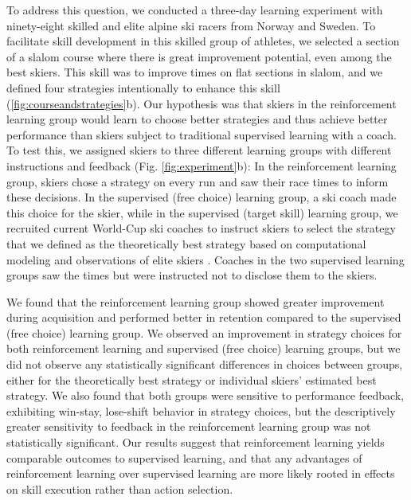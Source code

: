 \documentclass{article}
\begin{document}
To address this question, we conducted a three-day learning experiment with ninety-eight skilled and elite alpine ski racers from Norway and Sweden. To facilitate skill development in this skilled group of athletes, we selected a section of a slalom course where there is great improvement potential, even among the best skiers. This skill was to improve times on flat sections in slalom, and we defined four strategies intentionally to enhance this skill (\ref{fig:courseandstrategies}b). Our hypothesis was that skiers in the reinforcement learning group would learn to choose better strategies and thus achieve better performance than skiers subject to traditional supervised learning with a coach. To test this, we assigned skiers to three different learning groups with different instructions and feedback (Fig. \ref{fig:experiment}b): In the reinforcement learning group, skiers chose a strategy on every run and saw their race times to inform these decisions. In the supervised (free choice) learning group, a ski coach made this choice for the skier, while in the supervised (target skill) learning group, we recruited current World-Cup ski coaches to instruct skiers to select the strategy that we defined as the theoretically best strategy based on computational modeling \cite{lind_physics_2013} and observations of elite skiers \cite{reid_alpine_2020}. Coaches in the two supervised learning groups saw the times but were instructed not to disclose them to the skiers. 

We found that the reinforcement learning group showed greater improvement during acquisition and performed better in retention compared to the supervised (free choice) learning group. We observed an improvement in strategy choices for both reinforcement learning and supervised (free choice) learning groups, but we did not observe any statistically significant differences in choices between groups, either for the theoretically best strategy or individual skiers' estimated best strategy. We also found that both groups were sensitive to performance feedback, exhibiting win-stay, lose-shift behavior in strategy choices, but the descriptively greater sensitivity to feedback in the reinforcement learning group was not statistically significant. Our results suggest that reinforcement learning yields comparable outcomes to supervised learning, and that any advantages of reinforcement learning over supervised learning are more likely rooted in effects on skill execution rather than action selection. 
\end{document}
